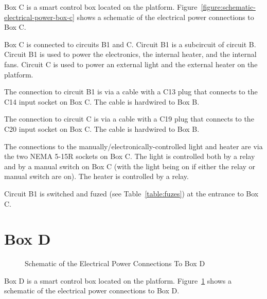 Box C is a smart control box located on the platform. Figure~\ref{figure:schematic-electrical-power-box-c} shows a schematic of the electrical power connections to Box C.


Box C is connected to circuits B1 and C. Circuit B1 is a subcircuit of circuit B. Circuit B1 is used to power the electronics, the internal heater, and the internal fans. Circuit C is used to power an external light and the external heater on the platform.

The connection to circuit B1 is via a cable with a C13 plug that connects to the C14 input socket on Box C. The cable is hardwired to Box B.

The connection to circuit C is via a cable with a C19 plug that connects to the C20 input socket on Box C. The cable is hardwired to Box B.

The connections to the manually/electronically-controlled light and heater are via the two NEMA 5-15R sockets on Box C. The light is controlled both by a relay and by a manual switch on Box C (with the light being on if either the relay or manual switch are on). The heater is controlled by a relay.

Circuit B1 is switched and fuzed (see Table~\ref{table:fuzes}) at the entrance to Box C.

\ifcoatlioan

\section{Box D}

\begin{figure}
\begin{center}
\footnotesize 
{}
\end{center}
\caption{Schematic of the Electrical Power Connections To Box D}
\label{figure:schematic-electrical-power-box-d}
\end{figure}

Box D is a smart control box located on the platform. Figure~\ref{figure:schematic-electrical-power-box-d} shows a schematic of the electrical power connections to Box D.

